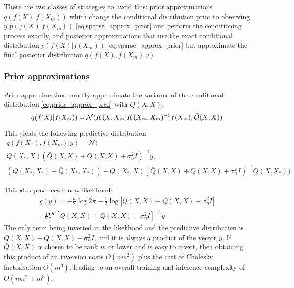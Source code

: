 There are two classes of strategies to avoid this: prior approximations $q(f(X) | f(X_m))$ which change the conditional distribution prior to observing $y$ $p(f(X) | f(X_m))$ \ref{eq:sparse_approx_prior} and perform the conditioning process exactly, and posterior approximations that use the exact conditional distribution $p(f(X) | f(X_m))$ \ref{eq:sparse_approx_prior} but approximate the final posterior distribution $q(f(X), f(X_m) | y)$. 

\subsubsection{Prior approximations}
Prior approximations modify approximate the variance of the conditional distribution \ref{eq:prior_approx_pred} with $\bar{Q}(X, X)$:
\begin{equation*}
    q(f(X) | f(X_m)) = \mathcal{N}( \\
        K(X, X_m) K(X_m, X_m)^{-1} f(X_m), \\
        \bar{Q}(X, X)
    )
\end{equation*}

This yields the following predictive distribution:
\begin{equation} \label{eq:prior_approx_pred}
    \begin{aligned}
        q(f(X_*), f(X_m) | y ) = \mathcal{N}( \\
        Q(X_*, X) \left( \bar{Q}(X, X) + Q(X, X) + \sigma_n^2 I \right)^{-1} y, \\
        \left( Q(X_*, X_*) + \bar{Q}(X_*, X_*) \right) - Q(X_*, X) \left( \bar{Q}(X, X) + Q(X, X) + \sigma_n^2 I \right)^{-1} Q(X, X_*)
    )
    \end{aligned}
\end{equation}

This also produces a new likelihood:
\begin{equation} \label{eq:prior_approx_likelihood}
    \begin{aligned}
        q(y) = -\frac{n}{2} \log 2\pi
        - \frac{1}{2} \log | \bar{Q}(X, X) + Q(X, X) + \sigma_n^2 I | \\
        - \frac{1}{2} Y^T [\bar{Q}(X, X) + Q(X, X) + \sigma_n^2 I]^{-1} y
    \end{aligned}
\end{equation}
The only term being inverted in the likelihood and the predictive distribution is $\bar{Q}(X, X) + Q(X, X) + \sigma_n^2 I$, and it is always a product of the vector $y$. If $\bar{Q}(X, X)$ is chosen to be rank $m$ or lower and is easy to invert, then obtaining this product of an inversion costs $O(nm^2)$ plus the cost of Cholesky factorisation $O(m^3)$, leading to an overall training and inference complexity of $O(nm^2 + m^3)$.

